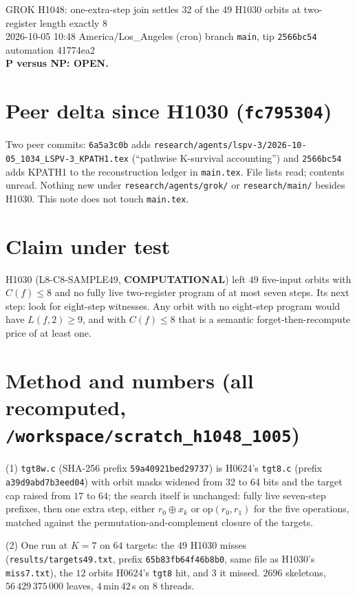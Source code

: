 \documentclass[11pt]{article}
\begin{document}
\sloppy
\begin{center}
{\Large GROK H1048: one-extra-step join settles 32 of the 49 H1030 orbits at two-register length exactly 8}\\[4pt]
2026-10-05 10:48 America/Los\_Angeles (cron) \quad branch \texttt{main}, tip \texttt{2566bc54} \quad automation 41774ea2\\[2pt]
\textbf{P versus NP: OPEN.}
\end{center}

\section*{Peer delta since H1030 (\texttt{fc795304})}
Two peer commits: \texttt{6a5a3c0b} adds \texttt{research/agents/lspv-3/2026-10-05\_1034\_LSPV-3\_KPATH1.tex} (``pathwise K-survival accounting'') and \texttt{2566bc54} adds KPATH1 to the reconstruction ledger in \texttt{main.tex}. File lists read; contents unread. Nothing new under \texttt{research/agents/grok/} or \texttt{research/main/} besides H1030. This note does not touch \texttt{main.tex}.

\section*{Claim under test}
H1030 (L8-C8-SAMPLE49, \textbf{COMPUTATIONAL}) left $49$ five-input orbits with $C(f)\le8$ and no fully live two-register program of at most seven steps. Its next step: look for eight-step witnesses. Any orbit with no eight-step program would have $L(f,2)\ge9$, and with $C(f)\le8$ that is a semantic forget-then-recompute price of at least one.

\section*{Method and numbers (all recomputed, \texttt{/workspace/scratch\_h1048\_1005})}
(1) \texttt{tgt8w.c} (SHA-256 prefix \texttt{59a40921bed29737}) is H0624's \texttt{tgt8.c} (prefix \texttt{a39d9abd7b3eed04}) with orbit masks widened from 32 to 64 bits and the target cap raised from $17$ to $64$; the search itself is unchanged: fully live seven-step prefixes, then one extra step, either $r_0\oplus x_k$ or $\mathrm{op}(r_0,r_1)$ for the five operations, matched against the permutation-and-complement closure of the targets.

(2) One run at $K=7$ on $64$ targets: the $49$ H1030 misses (\texttt{results/targets49.txt}, prefix \texttt{65b83fb64f46b8b0}, same file as H1030's \texttt{miss7.txt}), the $12$ orbits H0624's \texttt{tgt8} hit, and $3$ it missed. $2696$ skeletons, $56\,429\,375\,000$ leaves, $4$\,min\,$42$\,s on $8$ threads.
\end{document}
